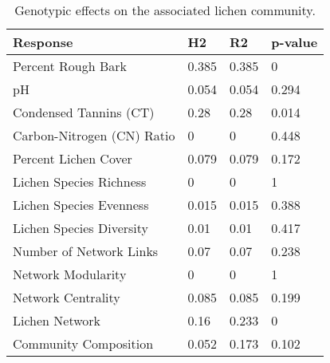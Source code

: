 \begin{table}[ht]
\centering
\begin{tabular}{llll}
  \hline
Response & H2 & R2 & p-value \\ 
  \hline
Percent Rough Bark & 0.385 & 0.385 & 0 \\ 
  pH & 0.054 & 0.054 & 0.294 \\ 
  Condensed Tannins (CT) & 0.28 & 0.28 & 0.014 \\ 
  Carbon-Nitrogen (CN) Ratio & 0 & 0 & 0.448 \\ 
  Percent Lichen Cover & 0.079 & 0.079 & 0.172 \\ 
  Lichen Species Richness & 0 & 0 & 1 \\ 
  Lichen Species Evenness & 0.015 & 0.015 & 0.388 \\ 
  Lichen Species Diversity & 0.01 & 0.01 & 0.417 \\ 
  Number of Network Links & 0.07 & 0.07 & 0.238 \\ 
  Network Modularity & 0 & 0 & 1 \\ 
  Network Centrality & 0.085 & 0.085 & 0.199 \\ 
  Lichen Network & 0.16 & 0.233 & 0 \\ 
  Community Composition & 0.052 & 0.173 & 0.102 \\ 
   \hline
\end{tabular}
\caption{Genotypic effects on the associated lichen community.} 
\label{tab:h2_table}
\end{table}
